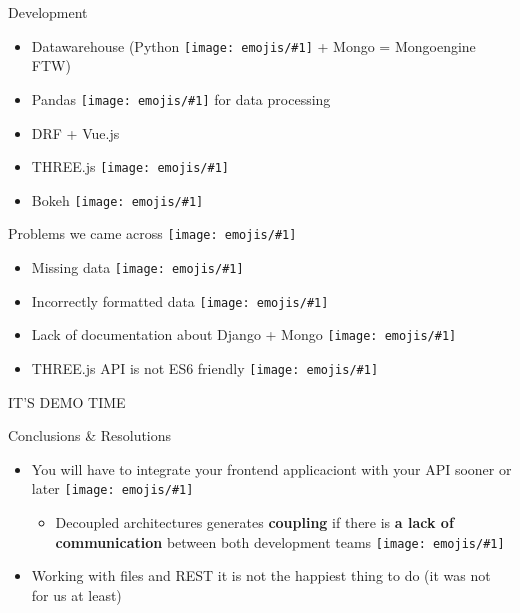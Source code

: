 \documentclass{beamer}
\newcommand{\emoji}[1]{\texttt{[image: emojis/\#1]}}
\begin{document}
\begin{frame}[fragile]{Development}
    \begin{itemize}
        \item Datawarehouse (Python \emoji{snake.png} + Mongo = Mongoengine FTW)
        \item Pandas \emoji{pandas.png} for data processing
        \item DRF + Vue.js
        \item THREE.js \emoji{eye.png}
        \item Bokeh \emoji{bar_charts.png}
    \end{itemize}
\end{frame}

\begin{frame}[fragile]{Problems we came across \emoji{see_no_evil.png}}
    \begin{itemize}
        \item Missing data \emoji{unamused.png}
        \item Incorrectly formatted data \emoji{facepalm.png}
        \item Lack of documentation about Django + Mongo \emoji{one_eyebrow.png}
        \item THREE.js API is not ES6 friendly \emoji{human_wheel.png}
    \end{itemize}
\end{frame}

\begin{frame}[fragile]
    \begin{center}
        \Huge
        IT'S DEMO TIME
    \end{center}
\end{frame}

\begin{frame}[fragile]{Conclusions \& Resolutions}
    \begin{itemize}
        \item You will have to integrate your frontend applicaciont  with your API sooner or later \emoji{man_shrugging.png}
        \begin{itemize}
            \item Decoupled architectures generates \textbf{coupling} if there is \textbf{a lack of communication} between both development teams \emoji{speak_no_evil.png}
        \end{itemize}
        \item Working with files and REST it is not the happiest thing to do (it was not for us at least)
    \end{itemize}
\end{frame}
\end{document}

